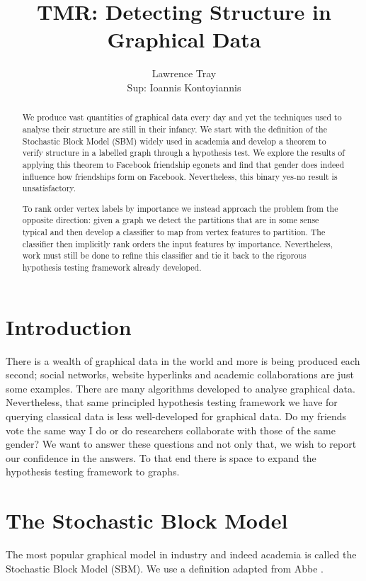 \documentclass[]{article}
\title{TMR: Detecting Structure in Graphical Data}
\author{Lawrence Tray \\ Sup: Ioannis Kontoyiannis}
\begin{document}
\maketitle

\begin{abstract}
We produce vast quantities of graphical data every day and yet the techniques used to analyse their structure are still in their infancy. We start with the definition of the Stochastic Block Model (SBM) widely used in academia and develop a theorem to verify structure in a labelled graph through a hypothesis test. We explore the results of applying this theorem to Facebook friendship egonets and find that gender does indeed influence how friendships form on Facebook. Nevertheless, this binary yes-no result is unsatisfactory.

To rank order vertex labels by importance we instead approach the problem from the opposite direction: given a graph we detect the partitions that are in some sense typical and then develop a classifier to map from vertex features to partition. The classifier then implicitly rank orders the input features by importance. Nevertheless, work must still be done to refine this classifier and tie it back to the rigorous hypothesis testing framework already developed.
\end{abstract}

\section{Introduction}

There is a wealth of graphical data in the world and more is being produced each second; social networks, website hyperlinks and academic collaborations are just some examples. There are many algorithms developed to analyse graphical data. Nevertheless, that same principled hypothesis testing framework we have for querying classical data is less well-developed for graphical data. Do my friends vote the same way I do or do researchers collaborate with those of the same gender? We want to answer these questions and not only that, we wish to report our confidence in the answers. To that end there is space to expand the hypothesis testing framework to graphs.

\section{The Stochastic Block Model}

The most popular graphical model in industry and indeed academia is called the Stochastic Block Model (SBM). We use a definition adapted from Abbe \cite{Abbe}.
\end{document}
